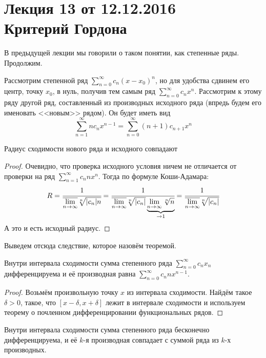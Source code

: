 \documentclass[a4paper, 12pt]{article}
\begin{document}
\newcommand{\B}{\mathcal{B}}
\newcommand{\D}{\mathcal{D}}

\pagestyle{fancy}
\section{Лекция 13 от 12.12.2016 \\ Критерий Гордона}

В предыдущей лекции мы говорили о таком понятии, как степенные ряды. Продолжим.
\par Рассмотрим степенной ряд $\sum\limits_{n = 0}^{\infty}c_n (x-x_0)^n$, но для удобства сдвинем его центр, точку $x_0$, в нуль, получив тем самым ряд $\sum\limits_{n = 0}^{\infty}c_n x^n$. Рассмотрим к этому ряду другой ряд, составленный из производных исходного ряда (впредь будем его именовать <<новым>> рядом). Он будет иметь вид
\[
    \sum\limits_{n = 1}^{\infty}nc_n x^{n - 1} = \sum\limits_{n = 0}^{\infty}(n+1)c_{n + 1} x^n
\]
\begin{Statement}
    Радиус сходимости нового ряда и исходного совпадают
\end{Statement}
\begin{proof}
    Очевидно, что проверка исходного условия ничем не отличается от проверки на ряд $\sum\limits_{n = 1}^{\infty}c_n n x^n$. Тогда по формуле Коши-Адамара:
    \[ 
        R = \cfrac{1}{\overline{\lim\limits_{n\to\infty}}\sqrt[n]{|c_n|n}} = \cfrac{1}{\overline{\lim\limits_{n\to\infty}}\sqrt[n]{|c_n|}\underbrace{\lim\limits_{n\to\infty}\sqrt[n]{n}}_{\to 1}} = \cfrac{1}{\overline{\lim\limits_{n\to\infty}}\sqrt[n]{|c_n|}}
    \]
    А это и есть исходный радиус.
\end{proof}
Выведем отсюда следствие, которое назовём теоремой.
\begin{Theorem}
    Внутри интервала сходимости сумма степенного ряда $\sum\limits_{n=0}^{\infty}c_nx_n$ дифференцируема и её производная равна $\sum\limits_{n=0}^{\infty}c_n n x^{n-1}$.
\end{Theorem}
\begin{proof}
    Возьмём произвольную точку $x$ из интервала сходимости. Найдём такое $\delta > 0$, такое, что $[x-\delta, x + \delta]$ лежит в интервале сходимости и используем теорему о почленном дифференцировании функциональных рядов.
\end{proof}
\begin{Consequence}
    Внутри интервала сходимости сумма степенного ряда бесконечно дифференцируема, и её $k$-я производная совпадает с суммой ряда из $k$-х производных.
\end{Consequence}
\end{document}
